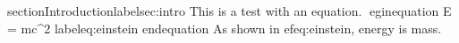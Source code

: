 
section{Introduction}label{sec:intro}
This is a test with an equation.
egin{equation}
E = mc^2 label{eq:einstein}
end{equation}
As shown in 
ef{eq:einstein}, energy is mass.
        